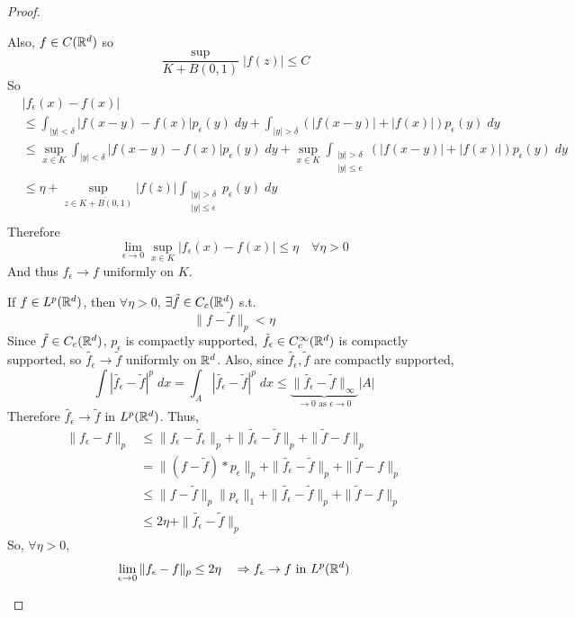 \begin{proof}
\begin{description}
        Also, $f \in C(\mathbb{R}^d)$ so 
        \[
            \frac{\sup}{K + B(0, 1)} |f(z)| \leq C
        \]
        So
        \begin{align*}
            &|f_\epsilon(x) - f(x)| \\ &\leq \int_{|y| < \delta} |f(x-y) - f(x)| p_\epsilon(y) \; dy + \int_{|y| > \delta} (|f(x-y)| + |f(x)|) p_\epsilon(y) \; dy \\
            &\leq \sup_{x \in K} \int_{|y| < \delta} |f(x-y) - f(x)| p_\epsilon(y) \; dy + \sup_{x \in K} \int_{\substack{|y| > \delta \\ |y| \leq \epsilon}} (|f(x-y)| + |f(x)|) p_\epsilon(y) \; dy \\
            &\leq \eta + \sup_{z \in \overline{K + B(0, 1)}} |f(z)| \int_{\substack{|y| > \delta \\ |y| \leq \epsilon}} p_\epsilon(y) \; dy \\
        \end{align*}      
        Therefore 
        \[
        \lim_{\epsilon \to 0} \sup_{x \in K} |f_\epsilon(x) - f(x)| \leq \eta \quad \forall \eta > 0 
        \]
        And thus $f_\epsilon \to f$ uniformly on $K$.   
        \item[(3)] If $f \in L^p(\mathbb{R}^d)$, then $\forall \eta > 0$, $\exists \tilde{f} \in C_c(\mathbb{R}^d)$
        s.t. 
        \[
        \| f - \tilde{f} \|_p < \eta
        \]  
        Since $\tilde{f} \in C_c(\mathbb{R}^d)$, $p_\epsilon$ is compactly supported, $\tilde{f_\epsilon} \in C_c^\infty(\mathbb{R}^d)$
        is compactly supported, so $\tilde{f_\epsilon} \to \tilde{f}$ uniformly on $\mathbb{R}^d$. Also,
        since $\tilde{f_\epsilon}, \tilde{f}$ are compactly supported, 
        \[
            \int |\tilde{f_\epsilon} - \tilde{f}|^p \; dx = \int_A |\tilde{f_\epsilon} - \tilde{f}|^p \; dx \leq \underbrace{\| \tilde{f_\epsilon} - \tilde{f} \|_\infty}_{\to 0 \text{ as } \epsilon \to 0} |A| 
        \]       
        Therefore $\tilde{f_\epsilon} \to \tilde{f}$ in $L^p(\mathbb{R}^d)$. Thus,
        \begin{align*}
            \| f_\epsilon - f \|_p &\leq \| f_\epsilon - \tilde{f_\epsilon} \|_p + \| \tilde{f_\epsilon} - \tilde{f} \|_p + \| \tilde{f} - f \|_p \\    
            &= \| (f - \tilde{f}) * p_\epsilon \|_p + \| \tilde{f_\epsilon}  - \tilde{f}\|_p + \| \tilde{f} - f \|_p \\
            &\leq \| f - \tilde{f} \|_p \| p_\epsilon \|_1 + \| \tilde{f_\epsilon} - \tilde{f} \|_p + \| \tilde{f} - f \|_p \\
            &\leq 2 \eta + \| \tilde{f_\epsilon} - \tilde{f} \|_p     
        \end{align*}  
        So, $\forall \eta > 0$,
        \[
            \lim_{\epsilon \to 0} \| f_\epsilon - f\|_p \leq 2 \eta \quad \Rightarrow f_\epsilon \to f \text{ in } L^p(\mathbb{R}^d) \qedhere 
        \]  
    \end{description}
\end{proof}

